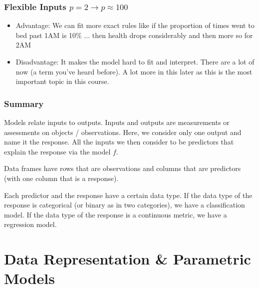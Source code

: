 \documentclass[handout]{beamer}
\begin{document}
\begin{frame}\frametitle{Flexible Inputs $p=2 \rightarrow p \approx 100$}

\begin{itemize}
\item Advantage: We can fit more exact rules like if the proportion of times went to bed past 1AM is 10\% ... then health drops considerably and then more so for 2AM
\item Disadvantage: It makes the model hard to fit and interpret. There are a lot of  now (a term you've heard before). A lot more in this later as this is the most important topic in this course.
\end{itemize}

\end{frame}

\begin{frame}\frametitle{Summary}

Models relate inputs to outputs. Inputs and outputs are measurements or assessments on objects / observations.  Here, we consider only one output and name it the response. All the inputs we then consider to be predictors that explain the response via the model $f$. 

Data frames have rows that are observations and columns that are predictors (with one column that is a response). 

Each predictor and the response have a certain data type. If the data type of the response is categorical (or binary as in two categories), we have a classification model. If the data type of the response is a continuous metric, we have a regression model.
	
\end{frame}

\section{Data Representation \& Parametric Models}
\end{document}
